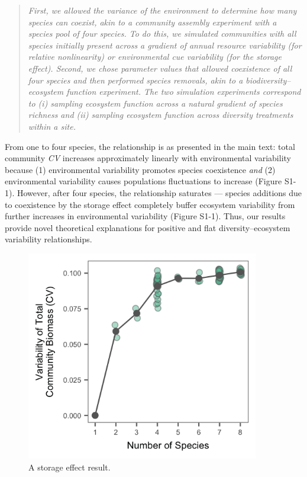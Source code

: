 \documentclass[11pt,]{article}
\begin{document}
\begin{quote}
\emph{First, we allowed the variance of the environment to determine how many species can coexist, akin to a community assembly experiment with a species pool of four species.
To do this, we simulated communities with all species initially present across a gradient of annual resource variability (for relative nonlinearity) or environmental cue variability (for the storage effect).
Second, we chose parameter values that allowed coexistence of all four species and then performed species removals, akin to a biodiversity--ecosystem function experiment.
The two simulation experiments correspond to (i) sampling ecosystem function across a natural gradient of species richness and (ii) sampling ecosystem function across diversity treatments within a site.}
\end{quote}

From one to four species, the relationship is as presented in the main
text: total community \emph{CV} increases approximately linearly with
environmental variability because (1) environmental variability promotes
species coexistence \emph{and} (2) environmental variability causes
populations fluctuations to increase (Figure S1-1). However, after four
species, the relationship saturates --- species additions due to
coexistence by the storage effect completely buffer ecosystem
variability from further increases in environmental variability (Figure
S1-1). Thus, our results provide novel theoretical explanations for
positive and flat diversity--ecosystem variability relationships.

\begin{figure}[!ht]
  \centering
      \includegraphics[width=4in]{./components/regional_diversity_stability_storage_effect_8species.png}
  \caption{A storage effect result.}
\end{figure}
\end{document}
